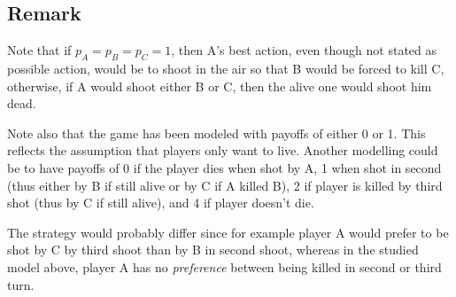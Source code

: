 \documentclass{article}
\begin{document}
\subsection{Remark}
Note that if $p_A = p_B = p_C = 1$, then A's best action, even though not stated as possible action, would be to shoot in the air
so that B would be forced to kill C, otherwise, if A would shoot either B or C, then the alive one would shoot him dead.

Note also that the game has been modeled with payoffs of either 0 or 1. This reflects the assumption that players only want
to live. Another modelling could be to have payoffs of 0 if the player dies when shot by A, 1 when shot in second (thus either by B if still alive
or by C if A killed B), 2 if player is killed by third shot (thus by C if still alive), and 4 if player doesn't die.

The strategy would probably differ since for example player A would prefer to be shot by C by third shoot than by B in second shoot,
whereas in the studied model above, player A has no \textit{preference} between being killed in second or third turn.
\end{document}
